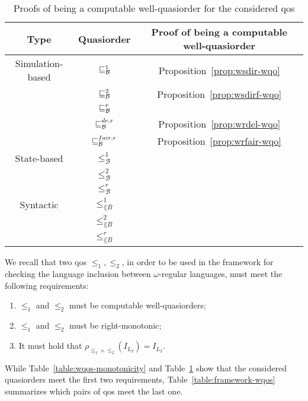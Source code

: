 \begin{table}[h]
\centering
\begin{tabular}{ c | c | c  }
    \textbf{Type} & \textbf{Quasiorder} & \textbf{Proof of being a computable well-quasiorder}  \\
    \hline
    \hline
    Simulation-based & $\sqsubseteq^1_{\mathcal{B}}$  &  Proposition~\ref{prop:wsdir-wqo} \\
    & $\sqsubseteq_{\mathcal{B}}^{2}$  & Proposition~\ref{prop:wsdirf-wqo}\\
    & $\sqsubseteq_{\mathcal{B}}^r$  &  \cite{ganty2019language}\\
    & $\sqsubseteq_{\mathcal{B}}^{de,r}$  &  Proposition~\ref{prop:wrdel-wqo}\\
    & $\sqsubseteq_{\mathcal{B}}^{fair,r}$  & Proposition~\ref{prop:wrfair-wqo}\\
    \hline
    State-based & $\leq_{\mathcal{B}}^1$ &  \cite{ganty2020omegalang} \\
    & $\leq_{\mathcal{B}}^2$ &  \cite{ganty2020omegalang} \\
    & $\leq_{\mathcal{B}}^r$ &  \cite{ganty2020omegalang} \\
    \hline
    Syntactic & $\leq_{\lang{B}}^1$ &  \cite{ganty2020omegalang} \\
    & $\leq_{\lang{B}}^2$ & \cite{ganty2020omegalang} \\
    & $\leq_{\lang{B}}^r$ & \cite{ganty2020omegalang} \\
\end{tabular}
\caption{Proofs of being a computable well-quasiorder for the considered qos}
\label{table:wqos-wqo}
\end{table}

We recall that two qos $\leq_1,\leq_2$, in order to be used in the
framework for checking the language inclusion between $\omega$-regular languages,
must meet the following requirements:
\begin{enumerate}
\item $\leq_1$ and $\leq_2$ must be computable well-quasiorders;
\item $\leq_1$ and $\leq_2$ must be right-monotonic;
\item It must hold that $\rho_{\leq_1 \times \leq_2}(I_{L_2}) = I_{L_2}$.
\end{enumerate}
While Table~\ref{table:wqos-monotonicity} and Table~\ref{table:wqos-wqo} show that
the considered quasiorders meet the first two requirements,
Table~\ref{table:framework-wqos} summarizes which pairs of qos
meet the last one.


